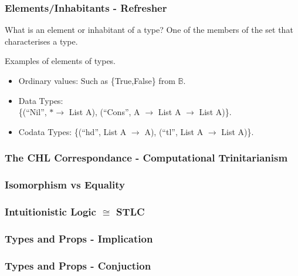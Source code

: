 \documentclass
  [hyperref={colorlinks = true,linkcolor = blue, 
             citecolor = blue, urlcolor = blue}
  ]{beamer}
\begin{document}
\begin{frame}[fragile]
  \frametitle{Elements/Inhabitants - Refresher}
  \begin{block}{What is an element or inhabitant of a type?}
    One of the members of the set that characterises a type.
  \end{block}
  \begin{block}{Examples of elements of types.}
    \begin{itemize}
      \item Ordinary values: Such as \{True,False\} from $\mathbb{B}$.
      \item Data Types:  \\ 
        \{(``Nil'', $\ast \rightarrow$ List A), (``Cons'', A
      $\rightarrow$ List A $\rightarrow$ List A)\}.
      \item Codata Types: \{(``hd'', List A $\rightarrow$ A), (``tl'', List A
      $\rightarrow$ List A)\}.
    \end{itemize}
  \end{block}
\end{frame}

\begin{frame}[fragile]
  \frametitle{The CHL Correspondance - Computational Trinitarianism}
\end{frame}

\begin{frame}[fragile]
  \frametitle{Isomorphism vs Equality}
\end{frame}

\begin{frame}[fragile]
  \frametitle{Intuitionistic Logic $\cong$ STLC}
\end{frame}

\begin{frame}[fragile]
  \frametitle{Types and Props - Implication}
\end{frame}

\begin{frame}[fragile]
  \frametitle{Types and Props - Conjuction}
\end{frame}
\end{document}
